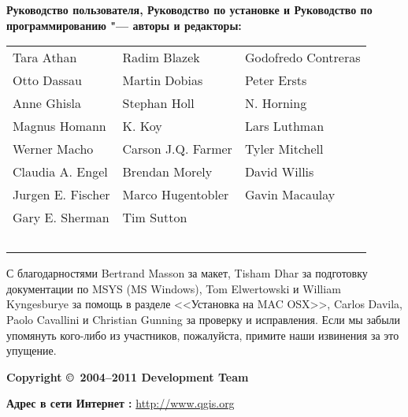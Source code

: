 \newpage

\begin{flushleft}
\textbf{Руководство пользователя, Руководство по установке и Руководство
по программированию "--- авторы и редакторы:}
\par\bigskip\noindent
\begin{tabular}{p{4cm} p{4cm} p{4cm}}
Tara Athan & Radim Blazek & Godofredo Contreras \\
Otto Dassau & Martin Dobias & Peter Ersts \\
Anne Ghisla & Stephan Holl & N. Horning \\
Magnus Homann & K. Koy & Lars Luthman \\
Werner Macho & Carson J.Q. Farmer & Tyler Mitchell \\
Claudia A. Engel & Brendan Morely & David Willis \\
Jurgen E. Fischer & Marco Hugentobler & Gavin Macaulay \\
Gary E. Sherman & Tim Sutton \\ \
\end{tabular}
\end{flushleft}

С благодарностями Bertrand Masson за макет, Tisham Dhar за подготовку
документации по MSYS (MS Windows), Tom Elwertowski и William Kyngesburye
за помощь в разделе <<Установка на MAC OSX>>, Carlos Davila, Paolo
Cavallini и Christian Gunning за проверку и исправления. Если мы
забыли упомянуть кого-либо из участников, пожалуйста, примите наши
извинения за это упущение.
\par\bigskip\noindent
\textbf{Copyright \copyright~2004--2011 \QG Development Team}
\par\bigskip\noindent
\textbf{Адрес в сети Интернет :} \url{http://www.qgis.org}
\par\bigskip\noindent


